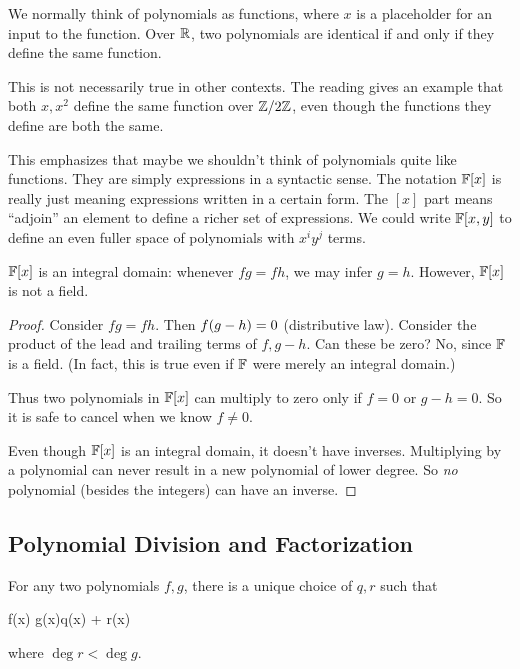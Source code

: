 \begin{remark}
  We normally think of polynomials as functions, where $x$ is a
  placeholder for an input to the function. Over $\mathbb{R}$, two polynomials
  are identical if and only if they define the same function.

  This is not necessarily true in other contexts. The reading gives an
  example that both $x, x^2$ define the same function over $\mathbb{Z} / 2\mathbb{Z}$,
  even though the functions they define are both the same.

  This emphasizes that maybe we shouldn't think of polynomials quite
  like functions. They are simply expressions in a syntactic sense. The
  notation $\mathbb{F}[x]$ is really just meaning expressions written in a
  certain form. The $[x]$ part means ``adjoin'' an element to define a
  richer set of expressions. We could write $\mathbb{F}[x, y]$ to define an
  even fuller space of polynomials with $x^i y^j$ terms.
\end{remark}

\begin{proposition}
  $\mathbb{F}[x]$ is an integral domain: whenever $fg = fh$, we may infer $g =
  h$. However, $\mathbb{F}[x]$ is not a field.
\end{proposition}

\begin{proof}
  Consider $fg = fh$. Then $f \mathopen{}\left( {g - h} \right)\mathclose{} = 0$ (distributive law).
  Consider the product of the lead and trailing terms of $f, g-h$. Can
  these be zero? No, since $\mathbb{F}$ is a field. (In fact, this is true even
  if $\mathbb{F}$ were merely an integral domain.)

  Thus two polynomials in $\mathbb{F}[x]$ can multiply to zero only if $f = 0$
  or $g - h = 0$. So it is safe to cancel when we know $f \ne 0$.

  Even though $\mathbb{F}[x]$ is an integral domain, it doesn't have inverses.
  Multiplying by a polynomial can never result in a new polynomial of
  lower degree. So \emph{no} polynomial (besides the integers) can have
  an inverse.
\end{proof}

\subsection{Polynomial Division and Factorization}

\begin{theorem}
  For any two polynomials $f, g$, there is a unique choice of $q, r$
  such that

  \begin{nedqn}
    f(x)
  \eqcol
    g(x)q(x) + r(x)
  \end{nedqn}

  \noindent
  where $\deg r < \deg g$.
\end{theorem}

